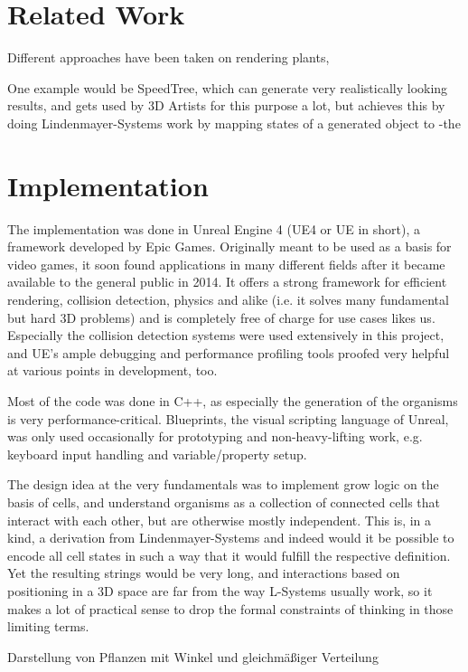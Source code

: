 \documentclass[11pt]{scrartcl}
\begin{document}
\section{Related Work}
Different approaches have been taken on rendering plants, 

One example would be SpeedTree, which can generate very realistically looking results, and gets used by 3D Artists for this purpose a lot, but achieves this by doing 
Lindenmayer-Systems work by mapping states of a generated object to 
-the 


\section{Implementation}
The implementation was done in Unreal Engine 4 (UE4 or UE in short), a framework developed by Epic Games. Originally meant to be used as a basis for video games, it soon found applications in many different fields after it became available to the general public in 2014. It offers a strong framework for efficient rendering, collision detection, physics and alike (i.e. it solves many fundamental but hard 3D problems) and is completely free of charge for use cases likes us. Especially the collision detection systems were used extensively in this project, and UE's ample debugging and performance profiling tools proofed very helpful at various points in development, too. 

Most of the code was done in C++, as especially the generation of the organisms is very performance-critical. Blueprints, the visual scripting language of Unreal, was only used occasionally for prototyping and non-heavy-lifting work, e.g. keyboard input handling and variable/property setup.

The design idea at the very fundamentals was to implement grow logic on the basis of cells, and understand organisms as a collection of connected cells that interact with each other, but are otherwise mostly independent. This is, in a kind, a derivation from Lindenmayer-Systems and indeed would it be possible to encode all cell states in such a way that it would fulfill the respective definition. Yet the resulting strings would be very long, and interactions based on positioning in a 3D space are far from the way L-Systems usually work, so it makes a lot of practical sense to drop the formal constraints of thinking in those limiting terms. 

Darstellung von Pflanzen mit Winkel und gleichmäßiger Verteilung
\end{document}
